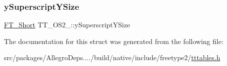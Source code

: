 \subsubsection{\texorpdfstring{y\+Superscript\+Y\+Size}{ySuperscriptYSize}}
{\footnotesize\ttfamily \hyperlink{fttypes_8h_aa7279be89046a2563cd3d4d6651fbdcf}{F\+T\+\_\+\+Short} T\+T\+\_\+\+O\+S2\+\_\+\+::y\+Superscript\+Y\+Size}



The documentation for this struct was generated from the following file\+:\begin{DoxyCompactItemize}
\item 
src/packages/\+Allegro\+Deps..../build/native/include/freetype2/\hyperlink{tttables_8h}{tttables.\+h}\end{DoxyCompactItemize}
